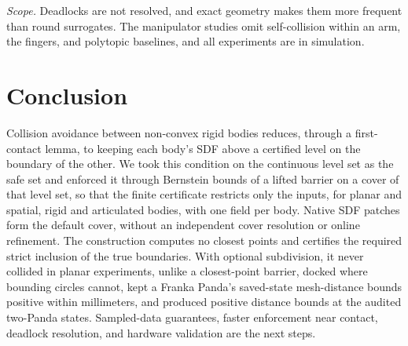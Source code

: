 \documentclass[journal]{IEEEtran}
\theoremstyle{definition}
\begin{document}
\emph{Scope.} Deadlocks are not resolved, and exact geometry makes them more frequent than round
surrogates. The manipulator studies omit self-collision within an arm, the fingers, and polytopic
baselines, and all experiments are in simulation.

\section{Conclusion}\label{sec:concl}
Collision avoidance between non-convex rigid bodies reduces, through a first-contact lemma, to
keeping each body's SDF above a certified level on the boundary of the other. We took this condition
on the continuous level set as the safe set and enforced it through Bernstein bounds of a lifted
barrier on a cover of that level set, so that the finite certificate restricts only the inputs, for
planar and spatial, rigid and articulated bodies, with one field per body. Native SDF patches form
the default cover, without an independent cover resolution or online refinement. The construction computes
no closest points and certifies the required strict inclusion of the true boundaries. With optional subdivision, it never collided in planar
experiments, unlike a closest-point barrier, docked where bounding circles cannot, kept a Franka
Panda's saved-state mesh-distance bounds positive within millimeters, and produced positive
distance bounds at the audited two-Panda states. Sampled-data
guarantees, faster enforcement near contact, deadlock resolution, and hardware validation are the
next steps.



\end{document}
